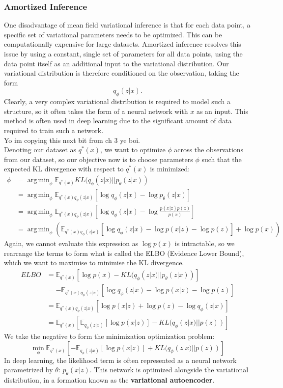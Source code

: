 \documentclass[a4paper,12pt]{article}
\newcommand{\E}{\mathbb{E}}
\DeclareMathOperator*{\argmin}{arg\,min}
\numberwithin{equation}{section}
\begin{document}
\subsubsection{Amortized Inference}
One disadvantage of mean field variational inference is that for each data point, a specific set of variational parameters needs to be optimized. This can be computationally expensive for large datasets. Amortized inference resolves this issue by using a constant, single set of parameters for all data points, using the data point itself as an additional input to the variational distribution. Our variational distribution is therefore conditioned on the observation, taking the form
\[q_\phi(z|x).\]
Clearly, a very complex variational distribution is required to model such a structure, so it often takes the form of a neural network with $x$ as an input. This method is often used in deep learning due to the significant amount of data required to train such a network.\\
Yo im copying this next bit from ch 3 ye boi.\\
Denoting our dataset as $q^*(x)$, we want to optimize $\phi$ across the observations from our dataset, so our objective now is to choose parameters $\phi$ such that the expected KL divergence with respect to $q^*(x)$ is minimized:
\begin{align*}
\phi &=\argmin_\phi \mathbb{E}_{q^*(x)}KL(q_\phi(z|x)||p_\theta (z|x))\\
&= \argmin_\phi \mathbb{E}_{q^*(x)q_\phi (z|x)}\left[\log q_\phi(z|x)-\log p_\theta(z|x)\right]\\
&=\argmin_\phi\mathbb{E}_{q^*(x)q_\phi (z|x)}\left[\log q_\phi(z|x)-\log \frac{p(x|z)p(z)}{p(x)}\right]\\
&=\argmin_\phi\left(\mathbb{E}_{q^*(x)q_\phi (z|x)}\left[\log q_\phi(z|x)-\log p(x|z)-\log p(z)\right]+\log p(x)\right)
\end{align*} 
Again, we cannot evaluate this expression as $\log p(x)$ is intractable, so we rearrange the terms to form what is called the ELBO (Evidence Lower Bound), which we want to maximise to minimise the KL divergence.
\begin{align*}
ELBO&=\mathbb{E}_{q^*(x)}[\log p(x)-KL(q_\phi(z|x)||p_\theta(z|x))]\\
&=-\mathbb{E}_{q^*(x)q_\phi(z|x)}\left[\log q_\phi(z|x)-\log p(x|z)-\log p(z)\right]\\
&=\mathbb{E}_{q^*(x)q_\phi(z|x)}\left[\log p(x|z)+\log p(z)-\log q_\phi(z|x)\right]\\
&=\mathbb{E}_{q^*(x)}\left[\E_{q_\phi(z|x)}[\log p(x|z)]-KL(q_\phi(z|x)||p(z))\right]
\end{align*}
We take the negative to form the minimization optimization problem:
\[\min_\phi \mathbb{E}_{q^*(x)}\left[-\E_{q_\phi(z|x)}[\log p(x|z)]+KL(q_\phi(z|x)||p(z))\right]\]
In deep learning, the likelihood term is often represented as a neural network parametrized by $\theta$: $p_\theta(x|z)$. This network is optimized alongside the variational distribution, in a formation known as the \textbf{variational autoencoder}.
\end{document}
